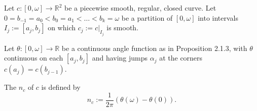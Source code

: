 Let $c: [0, \omega] \to \mathbb{R}^2$ be a piecewise smooth, regular, closed curve. Let $0 = b_{-1} = a_0 < b_0 = a_1 < \ldots < b_k = \omega$ be a partition of $[0, \omega]$ into intervals $I_j := [a_j, b_j]$ on which $c_j := c|_{I_j}$ is smooth.

Let $\theta: [0, \omega] \to \mathbb{R}$ be a continuous angle function as in Proposition 2.1.3, with $\theta$ continuous on each $[a_j, b_j]$ and having jumps $\alpha_j$ at the corners $c(a_j) = c(b_{j-1})$.

The  $n_c$ of $c$ is defined by
$$n_c := \frac{1}{2\pi}(\theta(\omega) - \theta(0)).$$
